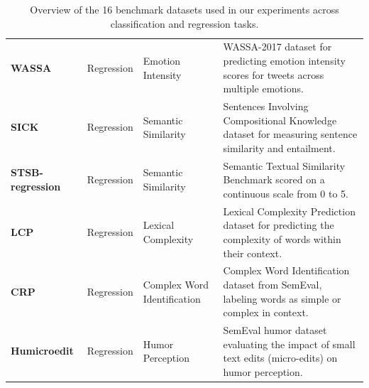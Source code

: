 \begin{table}[htbp]
{\begin{tabular}{l|l|l|p{9cm}}
\rowcolor[HTML]{F8DADA} \textbf{WASSA} \citep{vinayakumar2017deepcybernet} & Regression & Emotion Intensity & WASSA-2017 dataset for predicting emotion intensity scores for tweets across multiple emotions. \\
\rowcolor[HTML]{F8DADA} \textbf{SICK} \citep{marelli-etal-2014-sick} & Regression & Semantic Similarity & Sentences Involving Compositional Knowledge dataset for measuring sentence similarity and entailment. \\
\rowcolor[HTML]{F8DADA} \textbf{STSB-regression} \citep{cer2017semeval} & Regression & Semantic Similarity & Semantic Textual Similarity Benchmark scored on a continuous scale from 0 to 5. \\
\rowcolor[HTML]{F8DADA} \textbf{LCP} \citep{shardlow2020complex} & Regression & Lexical Complexity & Lexical Complexity Prediction dataset for predicting the complexity of words within their context. \\
\rowcolor[HTML]{F8DADA} \textbf{CRP} \citep{shardlow2020complex} & Regression & Complex Word Identification & Complex Word Identification dataset from SemEval, labeling words as simple or complex in context. \\
\rowcolor[HTML]{F8DADA} \textbf{Humicroedit} \citep{hossain2019president} & Regression & Humor Perception & SemEval humor dataset evaluating the impact of small text edits (micro-edits) on humor perception. \\
\hline
\end{tabular}%
}
\caption{Overview of the 16 benchmark datasets used in our experiments across classification and regression tasks.}
\label{tab:datasets}
\end{table}

